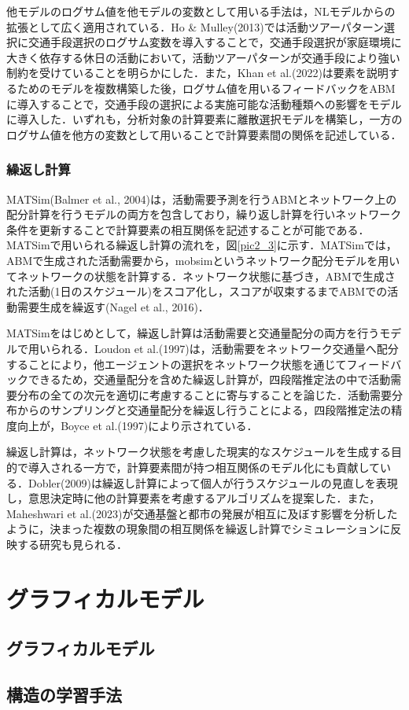 他モデルのログサム値を他モデルの変数として用いる手法は，NLモデルからの拡張として広く適用されている．Ho \& Mulley(2013)では活動ツアーパターン選択に交通手段選択のログサム変数を導入することで，交通手段選択が家庭環境に大きく依存する休日の活動において，活動ツアーパターンが交通手段により強い制約を受けていることを明らかにした．また，Khan et al.(2022)は要素を説明するためのモデルを複数構築した後，ログサム値を用いるフィードバックをABMに導入することで，交通手段の選択による実施可能な活動種類への影響をモデルに導入した．いずれも，分析対象の計算要素に離散選択モデルを構築し，一方のログサム値を他方の変数として用いることで計算要素間の関係を記述している．

\subsubsection{繰返し計算}
MATSim(Balmer et al., 2004)は，活動需要予測を行うABMとネットワーク上の配分計算を行うモデルの両方を包含しており，繰り返し計算を行いネットワーク条件を更新することで計算要素の相互関係を記述することが可能である．MATSimで用いられる繰返し計算の流れを，図\ref{pic2_3}に示す．MATSimでは，ABMで生成された活動需要から，mobsimというネットワーク配分モデルを用いてネットワークの状態を計算する．ネットワーク状態に基づき，ABMで生成された活動(1日のスケジュール)をスコア化し，スコアが収束するまでABMでの活動需要生成を繰返す(Nagel et al., 2016)．

MATSimをはじめとして，繰返し計算は活動需要と交通量配分の両方を行うモデルで用いられる．Loudon et al.(1997)は，活動需要をネットワーク交通量へ配分することにより，他エージェントの選択をネットワーク状態を通じてフィードバックできるため，交通量配分を含めた繰返し計算が，四段階推定法の中で活動需要分布の全ての次元を適切に考慮することに寄与することを論じた．活動需要分布からのサンプリングと交通量配分を繰返し行うことによる，四段階推定法の精度向上が，Boyce et al.(1997)により示されている．

繰返し計算は，ネットワーク状態を考慮した現実的なスケジュールを生成する目的で導入される一方で，計算要素間が持つ相互関係のモデル化にも貢献している．Dobler(2009)は繰返し計算によって個人が行うスケジュールの見直しを表現し，意思決定時に他の計算要素を考慮するアルゴリズムを提案した．また，Maheshwari et al.(2023)が交通基盤と都市の発展が相互に及ぼす影響を分析したように，決まった複数の現象間の相互関係を繰返し計算でシミュレーションに反映する研究も見られる．




\section{グラフィカルモデル}\label{2.3}

\subsection{グラフィカルモデル}\label{2.3.1}

\subsection{構造の学習手法}\label{2.3.2}